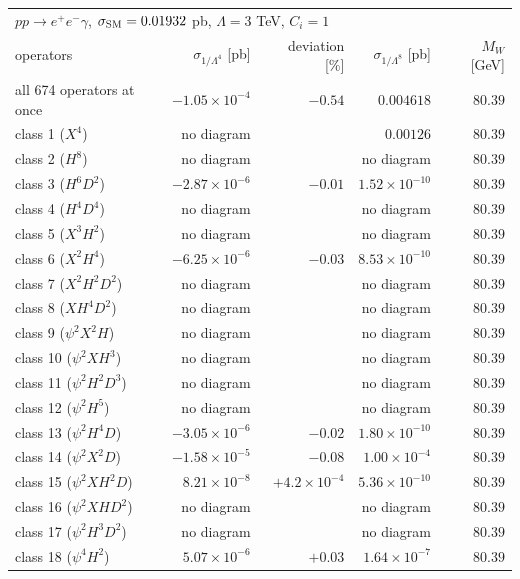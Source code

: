 \begin{table}[t]\centering\footnotesize\setlength{\tabcolsep}{4pt}
\begin{tabular}{@{}lrrrr@{}}\hline
\multicolumn{5}{l}{$p p \to e^+ e^- \gamma$, $\sigma_{\rm SM} = 0.01932$ pb, $\Lambda = 3$ TeV, $C_i = 1$}\\
operators & $\sigma_{1/\Lambda^4}$ [pb] & deviation [\%] & $\sigma_{1/\Lambda^8}$ [pb] & $M_W$ [GeV]\\\hline
all 674 operators at once & $-1.05\times 10^{-4}$ & $-0.54$ & $0.004618$ & $80.39$\\
class 1 ($X^4$) & no diagram &  & $0.00126$ & $80.39$\\
class 2 ($H^8$) & no diagram &  & no diagram & $80.39$\\
class 3 ($H^6 D^2$) & $-2.87\times 10^{-6}$ & $-0.01$ & $1.52\times 10^{-10}$ & $80.39$\\
class 4 ($H^4 D^4$) & no diagram &  & no diagram & $80.39$\\
class 5 ($X^3 H^2$) & no diagram &  & no diagram & $80.39$\\
class 6 ($X^2 H^4$) & $-6.25\times 10^{-6}$ & $-0.03$ & $8.53\times 10^{-10}$ & $80.39$\\
class 7 ($X^2 H^2 D^2$) & no diagram &  & no diagram & $80.39$\\
class 8 ($X H^4 D^2$) & no diagram &  & no diagram & $80.39$\\
class 9 ($\psi^2 X^2 H$) & no diagram &  & no diagram & $80.39$\\
class 10 ($\psi^2 X H^3$) & no diagram &  & no diagram & $80.39$\\
class 11 ($\psi^2 H^2 D^3$) & no diagram &  & no diagram & $80.39$\\
class 12 ($\psi^2 H^5$) & no diagram &  & no diagram & $80.39$\\
class 13 ($\psi^2 H^4 D$) & $-3.05\times 10^{-6}$ & $-0.02$ & $1.80\times 10^{-10}$ & $80.39$\\
class 14 ($\psi^2 X^2 D$) & $-1.58\times 10^{-5}$ & $-0.08$ & $1.00\times 10^{-4}$ & $80.39$\\
class 15 ($\psi^2 X H^2 D$) & $8.21\times 10^{-8}$ & $+4.2\times 10^{-4}$ & $5.36\times 10^{-10}$ & $80.39$\\
class 16 ($\psi^2 X H D^2$) & no diagram &  & no diagram & $80.39$\\
class 17 ($\psi^2 H^3 D^2$) & no diagram &  & no diagram & $80.39$\\
class 18 ($\psi^4 H^2$) & $5.07\times 10^{-6}$ & $+0.03$ & $1.64\times 10^{-7}$ & $80.39$\\

\end{tabular}
\end{table}
